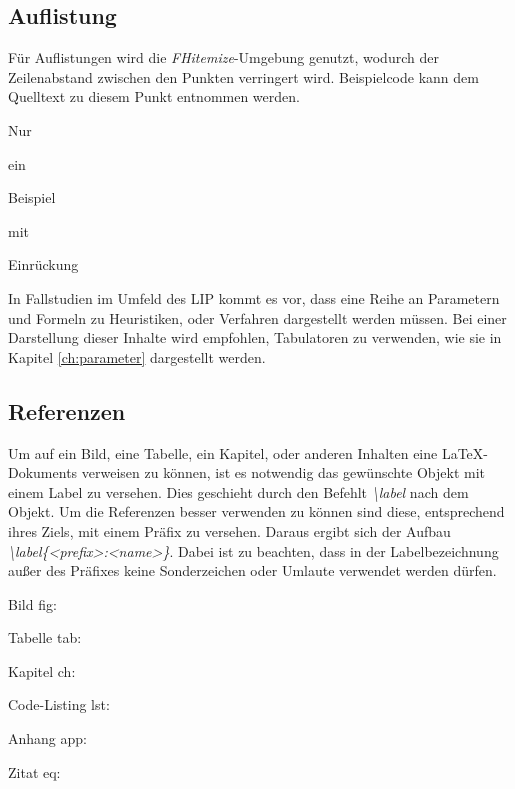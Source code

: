 		\subsection{Auflistung}

		Für Auflistungen wird die \textit{FHitemize}-Umgebung genutzt, wodurch der Zeilenabstand zwischen den Punkten verringert wird. Beispielcode kann dem Quelltext zu diesem Punkt entnommen werden.

		\begin{FHitemize}
			\item Nur
			\item ein
			\item Beispiel
			\begin{FHitemize}
				\item mit
				\item Einrückung
			\end{FHitemize}
		\end{FHitemize}

		In Fallstudien im Umfeld des \gls{LIP} kommt es vor, dass eine Reihe an Parametern und Formeln zu Heuristiken, oder Verfahren dargestellt werden müssen. Bei einer Darstellung dieser Inhalte wird empfohlen, Tabulatoren zu verwenden, wie sie in Kapitel \ref{ch:parameter} dargestellt werden.

		\subsection{Referenzen}
		\label{ch:referenz}
		Um auf ein Bild, eine Tabelle, ein Kapitel, oder anderen Inhalten eine \LaTeX-Dokuments verweisen zu können, ist es notwendig das gewünschte Objekt mit einem Label zu versehen. Dies geschieht durch den Befehlt \textit{\textbackslash label} nach dem Objekt. Um die Referenzen besser verwenden zu können sind diese, entsprechend ihres Ziels, mit einem Präfix zu versehen. Daraus ergibt sich der Aufbau \textit{\textbackslash label\{\textless prefix\textgreater:\textless name\textgreater\}}. Dabei ist zu beachten, dass in der Labelbezeichnung außer des Präfixes keine Sonderzeichen oder Umlaute verwendet werden dürfen.

		\begin{FHitemize}
			\item Bild fig:
			\item Tabelle tab:
			\item Kapitel ch:
			\item Code-Listing lst:
			\item Anhang app:
			\item Zitat eq:
		\end{FHitemize}

